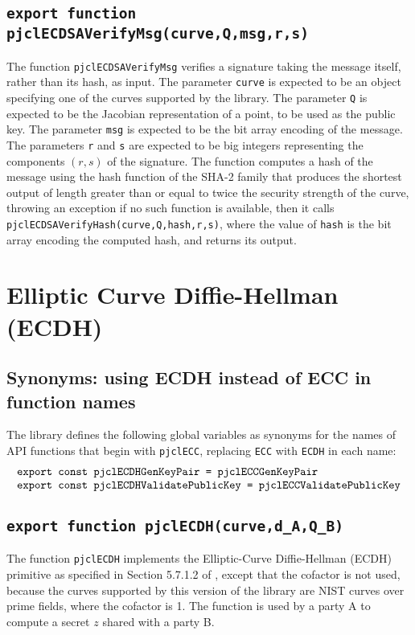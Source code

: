 \documentclass[12pt]{article}
\begin{document}
\subsection{\tt export function pjclECDSAVerifyMsg(curve,Q,msg,r,s)}

The function {\tt pjclECDSAVerifyMsg} verifies a signature taking the message itself, 
rather than its hash, as input.
The parameter {\tt curve} is expected to be an object specifying one of the curves supported by the library.
The parameter {\tt Q} is expected to be the Jacobian representation of a point,
to be used as the public key.
The parameter {\tt msg} is expected to be the bit array encoding of the message.
The parameters {\tt r} and {\tt s} are expected to be big integers
representing the components $(r,s)$ of the signature.
The function computes a hash of the message using the hash function of the 
SHA-2 family that produces the shortest output of length greater than or equal
to twice the security strength of the curve,
throwing an exception if no such function is available, then it calls
{\tt pjclECDSAVerifyHash(curve,Q,hash,r,s)}, where the value of {\tt hash}
is the bit array encoding the computed hash, and returns its output.

\section{Elliptic Curve Diffie-Hellman (ECDH)}
\label{s:last-api-section}

\subsection{Synonyms: using ECDH instead of ECC in function names}

The library defines the following global variables as 
synonyms for the names of API functions that begin with {\tt pjclECC},
replacing {\tt ECC} with {\tt ECDH} in each name:
$$
\begin{array}{l}
\mbox{\tt export const pjclECDHGenKeyPair = pjclECCGenKeyPair}\\
\mbox{\tt export const pjclECDHValidatePublicKey = pjclECCValidatePublicKey}
\end{array}
$$

\subsection{\tt export function pjclECDH(curve,d\_A,Q\_B)}

The function {\tt pjclECDH} implements the Elliptic-Curve Diffie-Hellman (ECDH) primitive
as specified in Section 5.7.1.2 of \cite{NIST-DH}, except that the cofactor is not used,
because the curves supported by this version of the library are NIST curves over prime fields,
where the cofactor is 1.  The function is used by a party A
to compute a secret $z$ shared with a party B.
\end{document}
